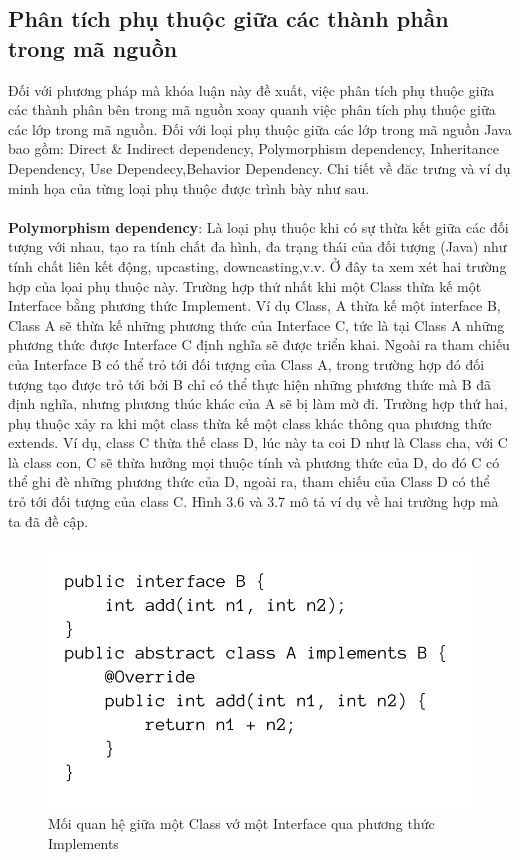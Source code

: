 \documentclass[12pt]{report}
\begin{document}
\subsection{Phân tích phụ thuộc giữa các thành phần trong mã nguồn}
Đối với phương pháp mà khóa luận này đề xuất, việc phân tích phụ thuộc giữa các thành phân bên trong mã nguồn xoay quanh việc phân tích phụ thuộc giữa các lớp trong mã nguồn. Đối với loại phụ thuộc giữa các lớp trong mã nguồn Java bao gồm: Direct \& Indirect dependency, Polymorphism dependency, Inheritance Dependency, Use Dependecy,Behavior Dependency. Chi tiết về đăc trưng và ví dụ minh họa của từng loại phụ thuộc được trình bày như sau.\\\\
\textbf{Polymorphism dependency}: Là loại phụ thuộc khi có sự thừa kết giữa các đối tượng với nhau, tạo ra tính chất đa hình, đa trạng thái của đối tượng (Java) như tính chất liên kết động, upcasting, downcasting,v.v. Ở đây ta xem xét hai trường hợp của lọai phụ thuộc này. Trường hợp thứ nhất khi một Class thừa kế một Interface bằng phương thức Implement. Ví dụ Class, A  thừa kế một interface B, Class A sẽ thừa kế những phương thức của Interface C, tức là tại Class A những phương thức được Interface C định nghĩa sẽ được triển khai. Ngoài ra tham chiếu của Interface B có thể trỏ tới đối tượng của Class A, trong trường hợp đó đối tượng tạo được trỏ tới bởi B chỉ có thể thực hiện những phương thức mà B đã định nghĩa, nhưng phương thúc khác của A sẽ bị làm mờ đi. Trường hợp thứ hai, phụ thuộc xảy ra khi một class thừa kế một class khác thông qua phương thức extends. Ví dụ, class C thừa thế class D, lúc này ta coi D như là Class cha, với C là class con, C sẽ thừa hưởng mọi thuộc tính và phương thức của  D, do đó C có thể ghi đè những phương thức của D, ngoài ra, tham chiếu của Class D có thể trỏ tới đối tượng của class C. Hình 3.6 và 3.7 mô tả ví dụ về hai trường hợp mà ta đã đề cập.
\begin{figure}[!htbp]
	\centering
	\includegraphics[scale=0.35]{images/AimplementsB}
	\caption{Mối quan hệ giữa một Class vớ một Interface qua phương thức Implements}
	\label{fig:A_implemets_B}
\end{figure}
\end{document}
